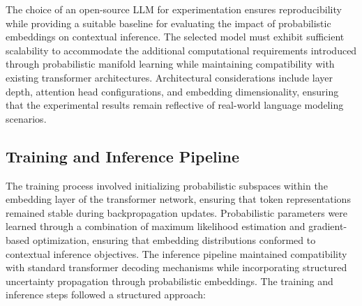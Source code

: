 \documentclass{article}
\begin{document}
The choice of an open-source LLM for experimentation ensures reproducibility while providing a suitable baseline for evaluating the impact of probabilistic embeddings on contextual inference. The selected model must exhibit sufficient scalability to accommodate the additional computational requirements introduced through probabilistic manifold learning while maintaining compatibility with existing transformer architectures. Architectural considerations include layer depth, attention head configurations, and embedding dimensionality, ensuring that the experimental results remain reflective of real-world language modeling scenarios.

\subsection{Training and Inference Pipeline}

The training process involved initializing probabilistic subspaces within the embedding layer of the transformer network, ensuring that token representations remained stable during backpropagation updates. Probabilistic parameters were learned through a combination of maximum likelihood estimation and gradient-based optimization, ensuring that embedding distributions conformed to contextual inference objectives. The inference pipeline maintained compatibility with standard transformer decoding mechanisms while incorporating structured uncertainty propagation through probabilistic embeddings. The training and inference steps followed a structured approach:
\end{document}
